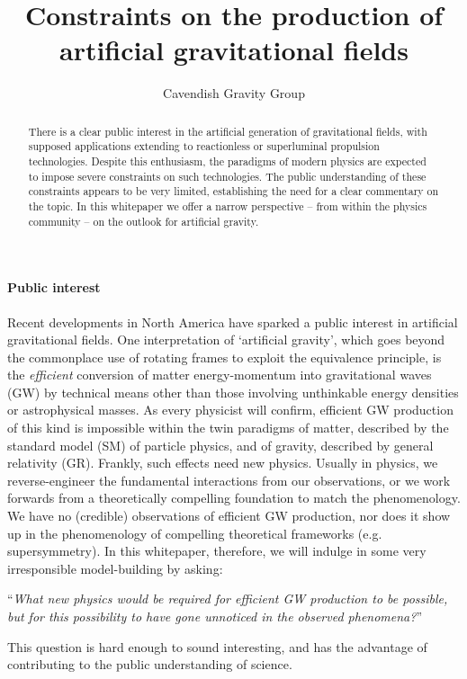 \documentclass[aps,prd,reprint,preprintnumbers,showpacs,floatfix,nofootinbib,superscript address,longbibliography]{revtex4-2}
\begin{document}
\title{Constraints on the production of artificial gravitational fields}

\author{Cavendish Gravity Group}


\begin{abstract}
	There is a clear public interest in the artificial generation of gravitational fields, with supposed applications extending to reactionless or superluminal propulsion technologies. Despite this enthusiasm, the paradigms of modern physics are expected to impose severe constraints on such technologies. The public understanding of these constraints appears to be very limited, establishing the need for a clear commentary on the topic. In this whitepaper we offer a narrow perspective -- from within the physics community -- on the outlook for artificial gravity.
\end{abstract}

\maketitle

\paragraph*{Public interest} Recent developments in North America have sparked a public interest in artificial gravitational fields. One interpretation of `artificial gravity', which goes beyond the commonplace use of rotating frames to exploit the equivalence principle, is the \emph{efficient} conversion of matter energy-momentum into gravitational waves (GW) by technical means other than those involving unthinkable energy densities or astrophysical masses. As every physicist will confirm, efficient GW production of this kind is impossible within the twin paradigms of matter, described by the standard model (SM) of particle physics, and of gravity, described by general relativity (GR). Frankly, such effects need new physics. Usually in physics, we reverse-engineer the fundamental interactions from our observations, or we work forwards from a theoretically compelling foundation to match the phenomenology. We have no (credible) observations of efficient GW production, nor does it show up in the phenomenology of compelling theoretical frameworks (e.g. supersymmetry). In this whitepaper, therefore, we will indulge in some very irresponsible model-building by asking:
{
\center
``\textit{What new physics would be required for efficient GW production to be possible, but for this possibility to have gone unnoticed in the observed phenomena?}''\par}
This question is hard enough to sound interesting, and has the advantage of contributing to the public understanding of science.
\end{document}
